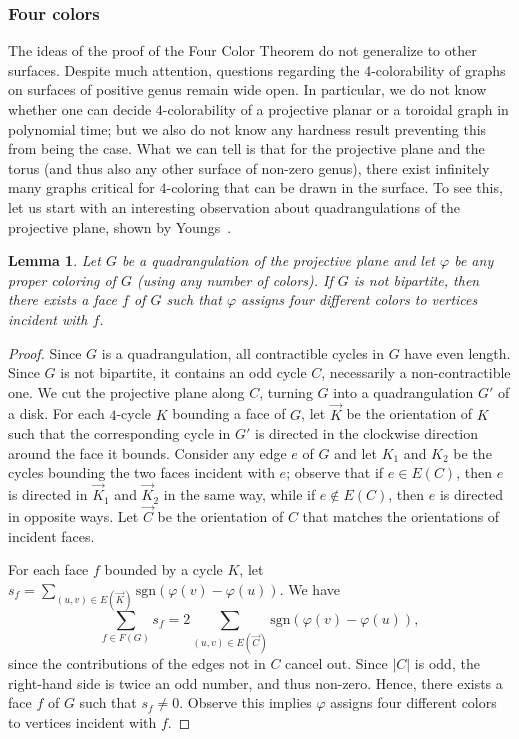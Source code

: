 \documentclass[12pt,twoside,openright,a4paper]{book}
\newtheorem{lemma}[theorem]{Lemma}
\newcommand{\sgn}{\text{sgn}}
\begin{document}
\subsubsection*{Four colors}
The ideas of the proof of the Four Color Theorem do not generalize to other surfaces.
Despite much attention, questions regarding the $4$-colorability of graphs on surfaces of positive genus remain wide open.
In particular, we do not know whether one can decide $4$-colorability of a projective planar or a toroidal
graph in polynomial time; but we also do not know any hardness result preventing this from being the case.
What we can tell is that for the projective plane and the torus (and thus also any other surface of non-zero genus),
there exist infinitely many graphs critical for $4$-coloring that can be drawn in the surface.
To see this, let us start with an interesting observation about quadrangulations of the projective plane,
shown by Youngs~\cite{youngs}.
\begin{lemma}\label{lemma:projall}
Let $G$ be a quadrangulation of the projective plane and let $\varphi$ be any proper coloring of $G$ (using any number of colors).
If $G$ is not bipartite, then there exists a face $f$ of $G$ such that $\varphi$ assigns four different colors to vertices
incident with $f$.
\end{lemma}
\begin{proof}
Since $G$ is a quadrangulation, all contractible cycles in $G$ have even length.  Since $G$ is not bipartite,
it contains an odd cycle $C$, necessarily a non-contractible one.  We cut the projective plane along $C$,
turning $G$ into a quadrangulation $G'$ of a disk.  For each $4$-cycle $K$ bounding a face of $G$,
let $\vec{K}$ be the orientation of $K$ such that the corresponding cycle in $G'$ is directed in the clockwise
direction around the face it bounds.  Consider any edge $e$ of $G$ and let $K_1$ and $K_2$ be the cycles bounding
the two faces incident with $e$; observe that if $e\in E(C)$, then $e$ is directed in $\vec{K}_1$ and $\vec{K}_2$
in the same way, while if $e\not\in E(C)$, then $e$ is directed in opposite ways.  Let $\vec{C}$ be the orientation
of $C$ that matches the orientations of incident faces.

For each face $f$ bounded by a cycle $K$, let $s_f=\sum_{(u,v)\in E(\vec{K})} \sgn(\varphi(v)-\varphi(u))$.
We have
$$\sum_{f\in F(G)} s_f=2\sum_{(u,v)\in E(\vec{C})} \sgn(\varphi(v)-\varphi(u)),$$ since the contributions of the edges not in $C$
cancel out.  Since $|C|$ is odd, the right-hand side is twice an odd number, and thus non-zero.  Hence, there exists a face $f$ of $G$
such that $s_f\neq 0$.  Observe this implies $\varphi$ assigns four different colors to vertices incident with $f$.
\end{proof}
\end{document}
